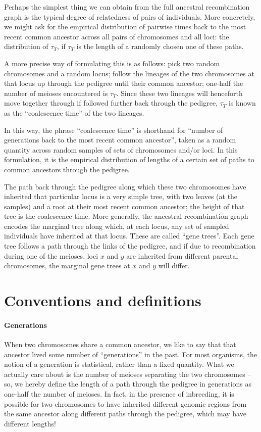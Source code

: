 Perhaps the simplest thing we can obtain from the full ancestral recombination graph 
is the typical degree of relatedness of pairs of individuals.
More concretely, we might ask for the empirical distribution
of pairwise times back to the most recent common ancestor
across all pairs of chromosomes and all loci:
the distribution of $\tau_T$, if $\tau_T$ is the length of a randomly chosen one of these paths.

A more precise way of formulating this is as follows:
pick two random chromosomes and a random locus;
follow the lineages of the two chromosomes at that locus up through the pedigree
until their common ancestor;
one-half the number of meioses encountered is $\tau_T$.
Since these two lineages will henceforth move together through if followed further back through the pedigree,
$\tau_T$ is known as the ``coalescence time'' of the two lineages.

In this way, the phrase ``coalescence time'' is shorthand
for ``number of generations back to the most recent common ancestor'',
taken as a random quantity across random samples of sets of chromosomes and/or loci.
In this formulation, it is the empirical distribution of lengths of a certain set of paths 
to common ancestors through the pedigree.

The path back through the pedigree along which these two chromosomes have inherited that particular locus
is a very simple tree, with two leaves (at the samples) and a root at their most recent common ancestor;
the height of that tree is the coalescence time.
More generally, the ancestral recombination graph encodes the marginal tree along which, 
at each locus, any set of sampled individuals have inherited at that locus.
These are called ``gene trees''.
Each gene tree follows a path through the links of the pedigree,
and if due to recombination during one of the meioses, 
loci $x$ and $y$ are inherited from different parental chromosomes,
the marginal gene trees at $x$ and $y$ will differ.


\section{Conventions and definitions}

\paragraph{Generations}
  When two chromosomes share a common ancestor, we like to say that that ancestor lived some number of ``generations'' in the past.
  For most organisms, the notion of a generation is statistical, rather than a fixed quantity.
  What we actually care about is the number of meioses separating the two chromosomes --
  so, we hereby define the length of a path through the pedigree in generations as one-half the number of meioses.
  In fact, in the presence of inbreeding, it is possible for two chromosomes to have inherited different genomic regions
  from the same ancestor along different paths through the pedigree, which may have different lengths!

